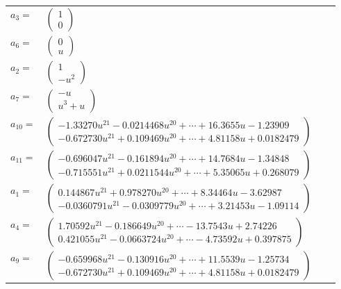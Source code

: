 \documentclass[1p]{elsarticle_modified}
\theoremstyle{definition}
\begin{document}
\begin{tabular}{m{7pt} m{180pt} m{7pt} m{180pt} }
\flushright $a_{3}=$&$\begin{pmatrix}1\\0\end{pmatrix}$ \\
\flushright $a_{6}=$&$\begin{pmatrix}0\\u\end{pmatrix}$ \\
\flushright $a_{2}=$&$\begin{pmatrix}1\\- u^2\end{pmatrix}$ \\
\flushright $a_{7}=$&$\begin{pmatrix}- u\\u^3+u\end{pmatrix}$ \\
\flushright $a_{10}=$&$\begin{pmatrix}-1.33270 u^{21}-0.0214468 u^{20}+\cdots+16.3655 u-1.23909\\-0.672730 u^{21}+0.109469 u^{20}+\cdots+4.81158 u+0.0182479\end{pmatrix}$ \\
\flushright $a_{11}=$&$\begin{pmatrix}-0.696047 u^{21}-0.161894 u^{20}+\cdots+14.7684 u-1.34848\\-0.715551 u^{21}+0.0211544 u^{20}+\cdots+5.35065 u+0.268079\end{pmatrix}$ \\
\flushright $a_{1}=$&$\begin{pmatrix}0.144867 u^{21}+0.978270 u^{20}+\cdots+8.34464 u-3.62987\\-0.0360791 u^{21}-0.0309779 u^{20}+\cdots+3.21453 u-1.09114\end{pmatrix}$ \\
\flushright $a_{4}=$&$\begin{pmatrix}1.70592 u^{21}-0.186649 u^{20}+\cdots-13.7543 u+2.74226\\0.421055 u^{21}-0.0663724 u^{20}+\cdots-4.73592 u+0.397875\end{pmatrix}$ \\
\flushright $a_{9}=$&$\begin{pmatrix}-0.659968 u^{21}-0.130916 u^{20}+\cdots+11.5539 u-1.25734\\-0.672730 u^{21}+0.109469 u^{20}+\cdots+4.81158 u+0.0182479\end{pmatrix}$ \\

\end{tabular}
\end{document}

